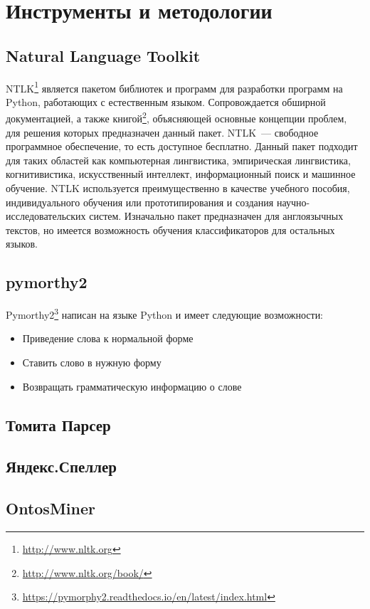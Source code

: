 \section{Инструменты и методологии}


\subsection{Natural Language Toolkit}

NTLK\footnote{\url{http://www.nltk.org}} является пакетом библиотек и программ для разработки программ на Python, работающих с естественным языком. Сопровождается обширной документацией, а также книгой\footnote{\url{http://www.nltk.org/book/}}, объясняющей основные концепции проблем, для решения которых предназначен данный пакет. NTLK~--- свободное программное обеспечение, то есть доступное бесплатно. Данный пакет подходит для таких областей как компьютерная лингвистика, эмпирическая лингвистика, когнитивистика, искусственный интеллект, информационный поиск и машинное обучение. NTLK используется преимущественно в качестве учебного пособия, индивидуального обучения или прототипирования и создания научно-исследовательских систем. Изначально пакет предназначен для англоязычных текстов, но имеется возможность обучения классификаторов для остальных языков.

\subsection{pymorthy2}

Pymorthy2\footnote{\url{https://pymorphy2.readthedocs.io/en/latest/index.html}} написан на языке Python и имеет следующие возможности:

\begin{itemize}

\item Приведение слова к нормальной форме

\item Ставить слово в нужную форму

\item Возвращать грамматическую информацию о слове

\end{itemize}



\subsection{Томита Парсер}

\subsection{Яндекс.Спеллер}

\subsection{OntosMiner}